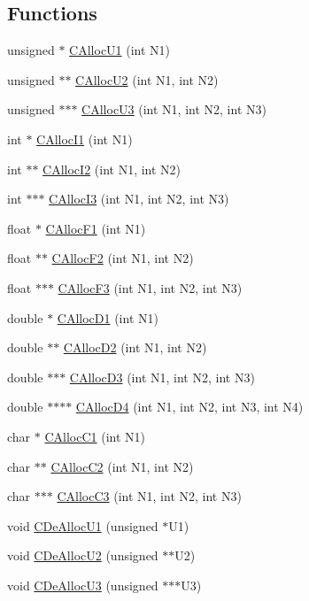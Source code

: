 \subsection*{Functions}
\begin{CompactItemize}
\item 
unsigned $\ast$ \hyperlink{useful__lib_8C_a9}{CAlloc\-U1} (int N1)
\item 
unsigned $\ast$$\ast$ \hyperlink{useful__lib_8C_a10}{CAlloc\-U2} (int N1, int N2)
\item 
unsigned $\ast$$\ast$$\ast$ \hyperlink{useful__lib_8C_a11}{CAlloc\-U3} (int N1, int N2, int N3)
\item 
int $\ast$ \hyperlink{useful__lib_8C_a12}{CAlloc\-I1} (int N1)
\item 
int $\ast$$\ast$ \hyperlink{useful__lib_8C_a13}{CAlloc\-I2} (int N1, int N2)
\item 
int $\ast$$\ast$$\ast$ \hyperlink{useful__lib_8C_a14}{CAlloc\-I3} (int N1, int N2, int N3)
\item 
float $\ast$ \hyperlink{useful__lib_8C_a15}{CAlloc\-F1} (int N1)
\item 
float $\ast$$\ast$ \hyperlink{useful__lib_8C_a16}{CAlloc\-F2} (int N1, int N2)
\item 
float $\ast$$\ast$$\ast$ \hyperlink{useful__lib_8C_a17}{CAlloc\-F3} (int N1, int N2, int N3)
\item 
double $\ast$ \hyperlink{useful__lib_8C_a18}{CAlloc\-D1} (int N1)
\item 
double $\ast$$\ast$ \hyperlink{useful__lib_8C_a19}{CAlloc\-D2} (int N1, int N2)
\item 
double $\ast$$\ast$$\ast$ \hyperlink{useful__lib_8C_a20}{CAlloc\-D3} (int N1, int N2, int N3)
\item 
double $\ast$$\ast$$\ast$$\ast$ \hyperlink{useful__lib_8C_a21}{CAlloc\-D4} (int N1, int N2, int N3, int N4)
\item 
char $\ast$ \hyperlink{useful__lib_8C_a22}{CAlloc\-C1} (int N1)
\item 
char $\ast$$\ast$ \hyperlink{useful__lib_8C_a23}{CAlloc\-C2} (int N1, int N2)
\item 
char $\ast$$\ast$$\ast$ \hyperlink{useful__lib_8C_a24}{CAlloc\-C3} (int N1, int N2, int N3)
\item 
void \hyperlink{useful__lib_8C_a25}{CDe\-Alloc\-U1} (unsigned $\ast$U1)
\item 
void \hyperlink{useful__lib_8C_a26}{CDe\-Alloc\-U2} (unsigned $\ast$$\ast$U2)
\item 
void \hyperlink{useful__lib_8C_a27}{CDe\-Alloc\-U3} (unsigned $\ast$$\ast$$\ast$U3)
$$
\end{CompactItemize}
